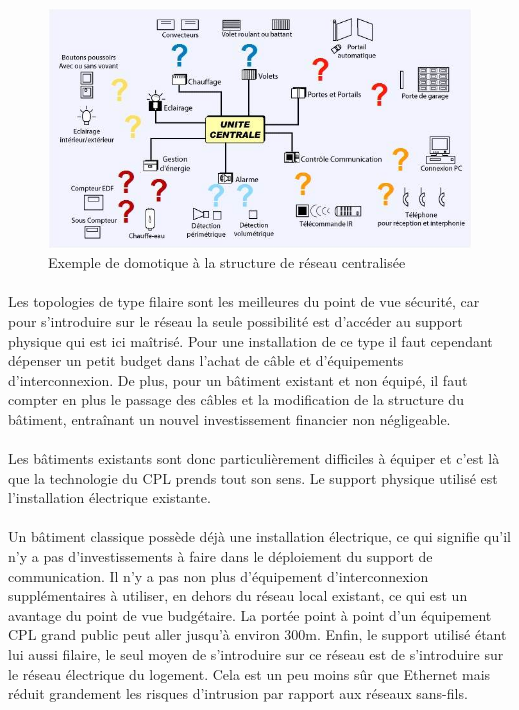         \begin{figure}[h]
            \begin{center}
                \includegraphics[scale=0.45]{./images/cpl/imageUniteCentrale.jpg}
            \end{center}
                \caption{ Exemple de domotique à la structure de réseau centralisée }
                \label{Exemple de domotique avec commande centrale}
        \end{figure}

    \paragraph{}
Les topologies de type filaire sont les meilleures du point de vue sécurité,
car pour s'introduire sur le réseau la seule possibilité est d’accéder au support physique qui est ici maîtrisé.
Pour une installation de ce type il faut cependant dépenser un petit budget dans l’achat de câble et d'équipements d’interconnexion.
De plus, pour un bâtiment existant et non équipé, il faut compter en plus le passage des câbles et la modification de la structure du bâtiment,
entraînant un nouvel investissement financier non négligeable.

    \paragraph{}
Les bâtiments existants sont donc particulièrement difficiles à équiper et c’est là que la technologie du CPL prends tout son sens.
Le support physique utilisé est l’installation électrique existante.
    \paragraph{}
Un bâtiment classique possède déjà une installation électrique,
ce qui signifie qu'il n'y a pas d’investissements à faire dans le déploiement du support de communication.
Il n’y a pas non plus d’équipement d’interconnexion supplémentaires à utiliser,
en dehors du réseau local existant, ce qui est un avantage du point de vue budgétaire.
La portée point à point d’un équipement CPL grand public peut aller jusqu’à environ 300m.
Enfin, le support utilisé étant lui aussi filaire, le seul moyen de s’introduire sur ce réseau est de s'introduire sur le réseau électrique du logement.
Cela est un peu moins sûr que Ethernet mais réduit grandement les risques d’intrusion par rapport aux réseaux sans-fils.

